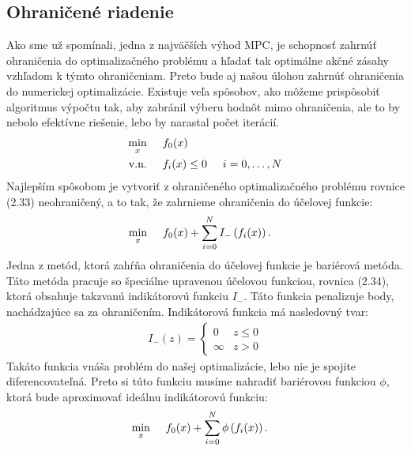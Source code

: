 \subsection{Ohraničené riadenie}
\label{subse:Ohranicenia}
Ako sme už spomínali, jedna z najväčších výhod MPC, je schopnosť zahrnúť ohraničenia do optimalizačného problému a hľadať tak optimálne akčné zásahy vzhľadom k týmto ohraničeniam. Preto bude aj našou úlohou zahrnúť ohraničenia do numerickej optimalizácie. Existuje veľa spôsobov, ako môžeme prispôsobiť algoritmus výpočtu tak, aby zabránil výberu hodnôt mimo ohraničenia, ale to by nebolo efektívne riešenie, lebo by narastal počet iterácií. 
\begin{subequations}
	\begin{align}
	\displaystyle \min_{x} \hspace{0.5cm} & 
	f_{0}(x)\\
	\textrm{v.n.} \hspace{0.5cm} & f_{i}(x) \leq 0 \hspace{0.5cm} i=0,\dots,N
	\end{align}
\end{subequations}
Najlepším spôsobom je vytvoriť z ohraničeného optimalizačného problému rovnice (2.33) neohraničený, a to tak, že zahrnieme ohraničenia do účelovej funkcie: 
\begin{align}
\displaystyle \min_{x} \hspace{0.5cm} & 
f_{0}(x) + \sum_{i=0}^{N}I_{-}\left(f_{i}(x)\right).
\end{align}
Jedna z metód, ktorá zahŕňa ohraničenia do účelovej funkcie je bariérová metóda. Táto metóda pracuje so špeciálne upravenou účelovou funkciou, rovnica (2.34), ktorá obsahuje takzvanú indikátorovú funkciu $I_{-}$. Táto funkcia penalizuje body, nachádzajúce sa za ohraničením. Indikátorová funkcia má nasledovný tvar:
\begin{align}
	I_{-}(z) =
	\begin{cases}
		0 & z \leq 0\\
		\infty & z > 0
	\end{cases}
\end{align}
Takáto funkcia vnáša problém do našej optimalizácie, lebo nie je spojite diferencovateľná. Preto si túto funkciu musíme nahradiť bariérovou funkciou $\phi$, ktorá bude aproximovať ideálnu indikátorovú funkciu:
\begin{align}
\displaystyle \min_{x} \hspace{0.5cm} & 
f_{0}(x) + \sum_{i=0}^{N}\phi\left(f_{i}(x)\right).
\end{align}

